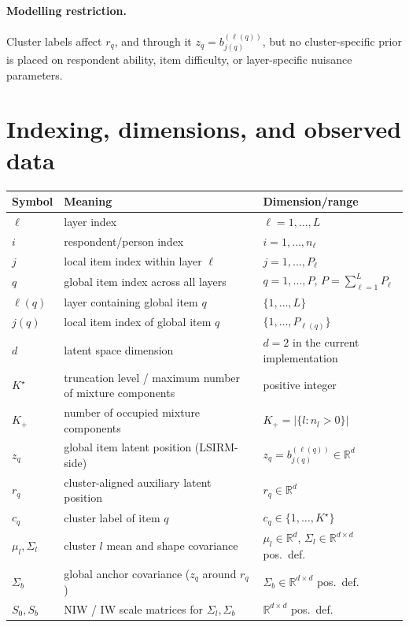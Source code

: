 \documentclass[11pt]{article}
\newcommand{\R}{\mathbb R}
\begin{document}
\paragraph{Modelling restriction.}
Cluster labels affect $r_q$, and through it $z_q=b_{j(q)}^{(\ell(q))}$, but
no cluster-specific prior is placed on respondent ability, item difficulty,
or layer-specific nuisance parameters.

\section{Indexing, dimensions, and observed data}

\begin{center}
\begin{tabular}{lll}
\toprule
Symbol & Meaning & Dimension/range \\
\midrule
$\ell$ & layer index & $\ell=1,\dots,L$ \\
$i$ & respondent/person index & $i=1,\dots,n_\ell$ \\
$j$ & local item index within layer $\ell$ & $j=1,\dots,P_\ell$ \\
$q$ & global item index across all layers & $q=1,\dots,P$, $P=\sum_{\ell=1}^L P_\ell$ \\
$\ell(q)$ & layer containing global item $q$ & $\{1,\dots,L\}$ \\
$j(q)$ & local item index of global item $q$ & $\{1,\dots,P_{\ell(q)}\}$ \\
$d$ & latent space dimension & $d=2$ in the current implementation \\
$K^\star$ & truncation level / maximum number of mixture components & positive integer \\
$K_+$ & number of occupied mixture components & $K_+=|\{l:n_l>0\}|$ \\
$z_q$ & global item latent position (LSIRM-side) & $z_q=b_{j(q)}^{(\ell(q))}\in\R^d$ \\
$r_q$ & cluster-aligned auxiliary latent position & $r_q\in\R^d$ \\
$c_q$ & cluster label of item $q$ & $c_q\in\{1,\dots,K^\star\}$ \\
$\mu_l,\Sigma_l$ & cluster $l$ mean and shape covariance & $\mu_l\in\R^d$, $\Sigma_l\in\R^{d\times d}$ pos.\ def. \\
$\Sigma_b$ & global anchor covariance ($z_q$ around $r_q$) & $\Sigma_b\in\R^{d\times d}$ pos.\ def. \\
$S_0,S_b$ & NIW / IW scale matrices for $\Sigma_l,\Sigma_b$ & $\R^{d\times d}$ pos.\ def. \\
\bottomrule
\end{tabular}
\end{center}
\end{document}
